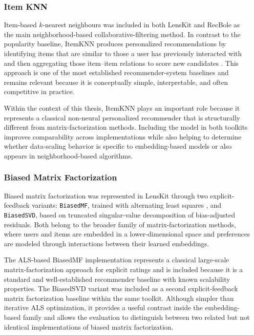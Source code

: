 \documentclass[12pt,a4paper]{article}
\begin{document}
\subsubsection{Item KNN}
Item-based $k$-nearest neighbours was included in both LensKit and RecBole as the main neighborhood-based collaborative-filtering method. In contrast to the popularity baseline, ItemKNN produces personalized recommendations by identifying items that are similar to those a user has previously interacted with and then aggregating those item--item relations to score new candidates \cite{itemknn}. This approach is one of the most established recommender-system baselines and remains relevant because it is conceptually simple, interpretable, and often competitive in practice.

Within the context of this thesis, ItemKNN plays an important role because it represents a classical non-neural personalized recommender that is structurally different from matrix-factorization methods. Including the model in both toolkits improves comparability across implementations while also helping to determine whether data-scaling behavior is specific to embedding-based models or also appears in neighborhood-based algorithms.

\subsubsection{Biased Matrix Factorization}
Biased matrix factorization was represented in LensKit through two explicit-feedback variants: \texttt{BiasedMF}, trained with alternating least squares \cite{biasedmf}, and \texttt{BiasedSVD}, based on truncated singular-value decomposition of bias-adjusted residuals. Both belong to the broader family of matrix-factorization methods, where users and items are embedded in a lower-dimensional space and preferences are modeled through interactions between their learned embeddings.

The ALS-based BiasedMF implementation represents a classical large-scale matrix-factorization approach for explicit ratings and is included because it is a standard and well-established recommender baseline with known scalability properties. The BiasedSVD variant was included as a second explicit-feedback matrix factorization baseline within the same toolkit. Although simpler than iterative ALS optimization, it provides a useful contrast inside the embedding-based family and allows the evaluation to distinguish between two related but not identical implementations of biased matrix factorization.
\end{document}
